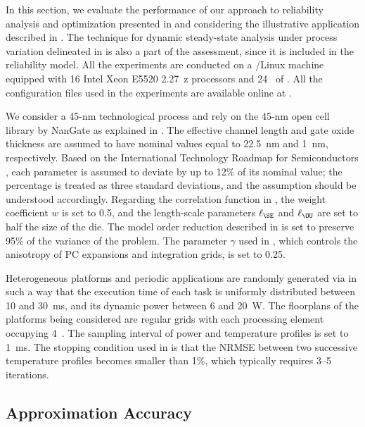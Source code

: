 In this section, we evaluate the performance of our approach to reliability
analysis and optimization presented in  and
 considering the illustrative application described in
. The technique for dynamic steady-state
analysis under process variation delineated in
 is also a part of the assessment, since it
is included in the reliability model. All the experiments are conducted on a
/Linux machine equipped with 16 Intel Xeon E5520 2.27~z
processors and 24~ of . All the configuration files used in the
experiments are available online at \cite{eslab2015}.

We consider a 45-nm technological process and rely on the 45-nm open cell
library by NanGate \cite{nangate} as explained in
. The effective channel length and gate
oxide thickness are assumed to have nominal values equal to 22.5~nm and 1~nm,
respectively. Based on the International Technology Roadmap for Semiconductors
\cite{itrs}, each parameter is assumed to deviate by up to 12\% of its nominal
value; the percentage is treated as three standard deviations, and the
assumption should be understood accordingly. Regarding the correlation function
in , the weight coefficient $w$ is set to 0.5, and the
length-scale parameters $\ell_\SE$ and $\ell_\OU$ are set to half the size of
the die. The model order reduction described in
 is set to preserve 95\% of the variance of the
problem. The parameter $\gamma$ used in , which
controls the anisotropy of \ac{PC} expansions and integration grids, is set to
0.25.

Heterogeneous platforms and periodic applications are randomly generated via
 \cite{dick1998} in such a way that the execution time of each task is
uniformly distributed between 10 and 30~ms, and its dynamic power between 6 and
20~W. The floorplans of the platforms being considered are regular grids with
each processing element occupying 4~. The sampling interval \dt of
power and temperature profiles is set to 1~ms. The stopping condition used in
 is that the \ac{NRMSE} between
two successive temperature profiles becomes smaller than 1\%, which typically
requires 3--5 iterations.

\subsection{Approximation Accuracy}

